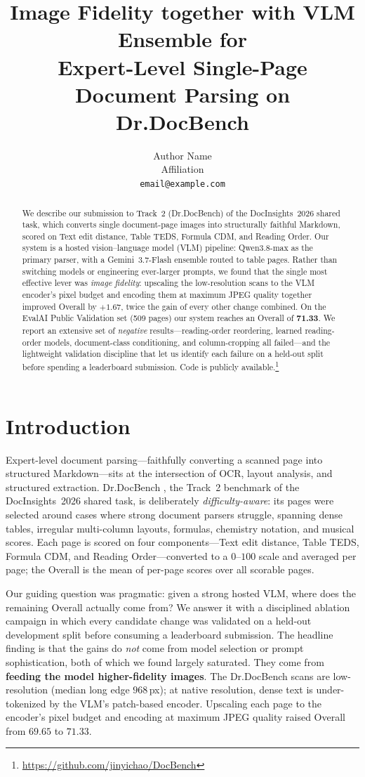 \documentclass[11pt]{article}
\title{Image Fidelity together with VLM Ensemble for\\
Expert-Level Single-Page Document Parsing on Dr.DocBench}
\author{Author Name \\
  Affiliation \\
  \texttt{email@example.com}}
\newcommand{\best}[1]{\textbf{#1}}
\begin{document}
\maketitle

\begin{abstract}
We describe our submission to Track~2 (Dr.DocBench) of the DocInsights~2026 shared
task, which converts single document-page images into structurally faithful
Markdown, scored on Text edit distance, Table TEDS, Formula CDM, and Reading Order.
Our system is a hosted vision--language model (VLM) pipeline: Qwen3.8-max as the
primary parser, with a Gemini~3.7-Flash ensemble routed to table pages. Rather than
switching models or engineering ever-larger prompts, we found that the single most
effective lever was \emph{image fidelity}: upscaling the low-resolution scans to the
VLM encoder's pixel budget and encoding them at maximum JPEG quality together
improved Overall by $+1.67$, twice the gain of every other change combined. On the
EvalAI Public Validation set (509 pages) our system reaches an Overall of
\best{71.33}. We report an extensive set of \emph{negative} results---reading-order
reordering, learned reading-order models, document-class conditioning, and
column-cropping all failed---and the lightweight validation discipline that let us
identify each failure on a held-out split before spending a leaderboard submission.
Code is publicly available.\footnote{\url{https://github.com/jinyichao/DocBench}}
\end{abstract}

\section{Introduction}
Expert-level document parsing---faithfully converting a scanned page into
structured Markdown---sits at the intersection of OCR, layout analysis, and
structured extraction. Dr.DocBench \citep{yang2026dr}, the Track~2 benchmark of
the DocInsights~2026 shared task, is deliberately \emph{difficulty-aware}: its pages
were selected around cases where strong document parsers struggle, spanning dense
tables, irregular multi-column layouts, formulas, chemistry notation, and musical
scores. Each page is scored on four components---Text edit distance, Table TEDS,
Formula CDM, and Reading Order---converted to a $0$--$100$ scale and averaged per
page; the Overall is the mean of per-page scores over all scorable pages.

Our guiding question was pragmatic: given a strong hosted VLM, where does the
remaining Overall actually come from? We answer it with a disciplined ablation
campaign in which every candidate change was validated on a held-out development
split before consuming a leaderboard submission. The headline finding is that the
gains do \emph{not} come from model selection or prompt sophistication, both of
which we found largely saturated. They come from \textbf{feeding the model
higher-fidelity images}. The Dr.DocBench scans are low-resolution (median long edge
$968$\,px); at native resolution, dense text is under-tokenized by the VLM's
patch-based encoder. Upscaling each page to the encoder's pixel budget and encoding
at maximum JPEG quality raised Overall from $69.65$ to $71.33$.
\end{document}
